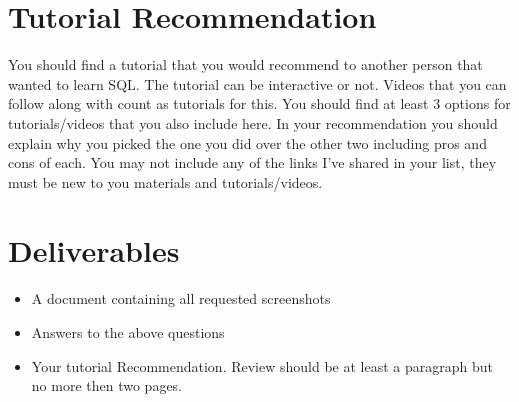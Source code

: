 \documentclass[12pt]{article}
\begin{document}
    \section*{Tutorial Recommendation}
You should find a tutorial that you would recommend to another person that wanted to learn SQL.  The tutorial can be interactive or not.  Videos that you can follow along with count as tutorials for this. You should find at least 3 options for tutorials/videos that you also include here. In your recommendation you should explain why you picked the one you did over the other two including pros and cons of each. You may not include any of the links I've shared in your list, they must be new to you materials and tutorials/videos. 


\section*{Deliverables}
\begin{itemize}
    \item A document containing all requested screenshots
    \item Answers to the above questions
    \item Your tutorial Recommendation.  Review should be at least a paragraph but no more then two pages. 
\end{itemize} 
\end{document}
